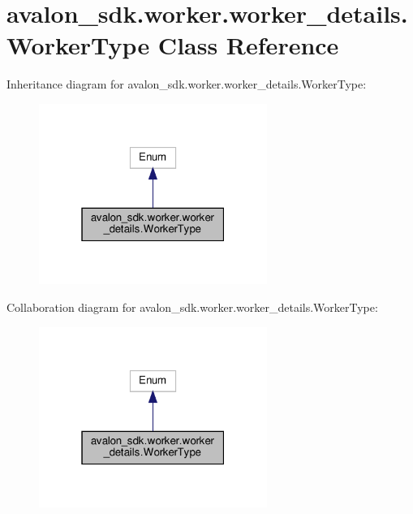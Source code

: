 \hypertarget{classavalon__sdk_1_1worker_1_1worker__details_1_1WorkerType}{}\section{avalon\+\_\+sdk.\+worker.\+worker\+\_\+details.\+Worker\+Type Class Reference}
\label{classavalon__sdk_1_1worker_1_1worker__details_1_1WorkerType}


Inheritance diagram for avalon\+\_\+sdk.\+worker.\+worker\+\_\+details.\+Worker\+Type\+:
\nopagebreak
\begin{figure}[H]
\begin{center}
\leavevmode
\includegraphics[width=211pt]{classavalon__sdk_1_1worker_1_1worker__details_1_1WorkerType__inherit__graph}
\end{center}
\end{figure}


Collaboration diagram for avalon\+\_\+sdk.\+worker.\+worker\+\_\+details.\+Worker\+Type\+:
\nopagebreak
\begin{figure}[H]
\begin{center}
\leavevmode
\includegraphics[width=211pt]{classavalon__sdk_1_1worker_1_1worker__details_1_1WorkerType__coll__graph}
\end{center}
\end{figure}
